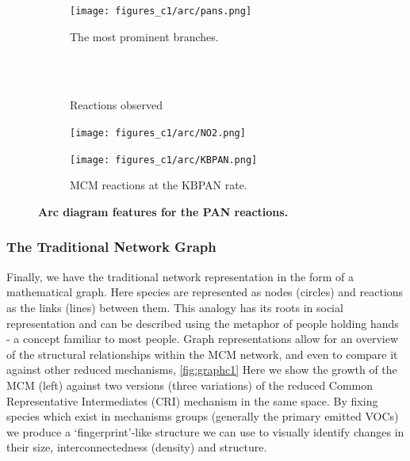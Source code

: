 \begin{figure}[H]
     \centering
      \begin{subfigure}[b]{.4\textwidth}
         \centering
         \texttt{[image: figures\_c1/arc/pans.png]}
         \caption{The most prominent branches. }
         \label{fig:pansdir}
     \end{subfigure}
      \begin{subfigure}[b]{.4\textwidth}
         \centering
            \\ \ \\
    \hfill
         \caption{Reactions observed}
         \label{fig:rxnpan}
     \end{subfigure}
     \begin{subfigure}[b]{.4\textwidth}
         \centering
         \texttt{[image: figures\_c1/arc/NO2.png]}
         \caption{}
         \label{fig:no2}
     \end{subfigure}
     \begin{subfigure}[b]{.4\textwidth}
         \centering
         \texttt{[image: figures\_c1/arc/KBPAN.png]}
         \caption{MCM reactions at the KBPAN rate.}
         \label{fig:kbpan}
     \end{subfigure}
      \caption{\textbf{ Arc diagram features for the PAN reactions. } }
        \label{fig:panno2}
\end{figure}



%
%
\newpage


\subsubsection{The Traditional Network Graph}\label{sec:tradnetconc}

Finally, we have the traditional network representation in the form of a mathematical graph. Here species are represented as nodes (circles) and reactions as the links (lines) between them. This analogy has its roots in social representation and can be described using the metaphor of people holding hands - a concept familiar to most people. Graph representations allow for an overview of the structural relationships within the MCM network, and even to compare it against other reduced mechanisms, \autoref{fig:graphc1}
Here we show the growth of the MCM (left) against two versions (three variations) of the reduced Common Representative Intermediates (CRI) \citep{cri} mechanism in the same space. By fixing species which exist in mechanisms groups (generally the primary emitted VOCs) we produce a `fingerprint'-like structure we can use to visually identify changes in their size, interconnectedness (density) and structure. 

